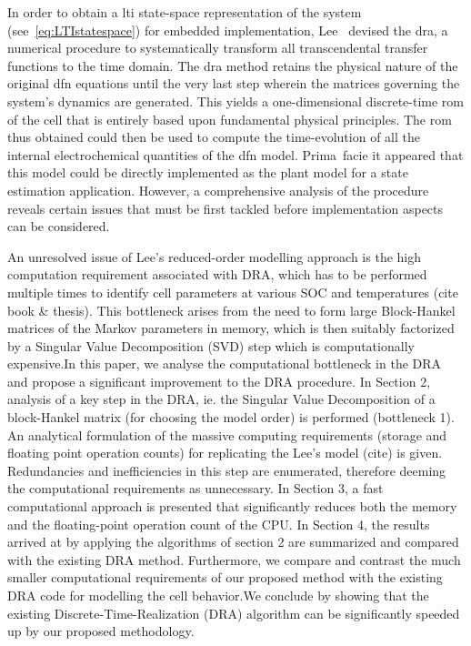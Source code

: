 In  order  to  obtain  a  \gls{lti} state-space  representation  of  the  system
(see~\cref{eq:LTIstatespace}) for  embedded implementation,  Lee~\etal{} devised
the   \gls{dra},  a   numerical  procedure   to  systematically   transform  all
transcendental  transfer functions  to  the time  domain.  The \gls{dra}  method
retains  the physical  nature  of  the original  \gls{dfn}  equations until  the
very  last  step  wherein  the  matrices governing  the  system's  dynamics  are
generated. This  yields a  one-dimensional discrete-time  \gls{rom} of  the cell
that is entirely based upon  fundamental physical principles. The \gls{rom} thus
obtained could  then be used to  compute the time-evolution of  all the internal
electrochemical quantities of the \gls{dfn}  model. Prima~facie it appeared that
this  model  could be  directly  implemented  as the  plant  model  for a  state
estimation  application.  However, a  comprehensive  analysis  of the  procedure
reveals certain issues that must  be first tackled before implementation aspects
can be considered.


An unresolved issue of Lee\textquoteright  s reduced-order modelling approach is
the high computation requirement associated with  DRA, which has to be performed
multiple  times to  identify cell  parameters  at various  SOC and  temperatures
(cite  book \&  thesis). This  bottleneck  arises from  the need  to form  large
Block-Hankel matrices of the Markov parameters in memory, which is then suitably
factorized by a Singular Value Decomposition (SVD) step which is computationally
expensive.In this paper, we analyse the  computational bottleneck in the DRA and
propose a significant  improvement to the DRA procedure. In  Section 2, analysis
of a key step in the DRA, ie. the Singular Value Decomposition of a block-Hankel
matrix (for choosing the model order) is performed (bottleneck 1). An analytical
formulation of  the massive computing  requirements (storage and  floating point
operation  counts) for  replicating  the Lee\textquoteright  s  model (cite)  is
given. Redundancies  and inefficiencies in  this step are  enumerated, therefore
deeming  the computational  requirements as  unnecessary. In  Section 3,  a fast
computational approach is  presented that significantly reduces  both the memory
and the  floating-point operation count  of the CPU.  In Section 4,  the results
arrived at by  applying the algorithms of section 2  are summarized and compared
with the  existing DRA  method. Furthermore,  we compare  and contrast  the much
smaller computational requirements of our  proposed method with the existing DRA
code for  modelling the cell behavior.We  conclude by showing that  the existing
Discrete-Time-Realization (DRA) algorithm can be significantly speeded up by our
proposed methodology.


